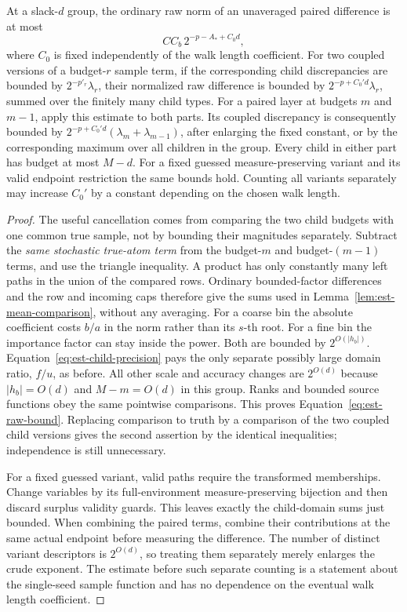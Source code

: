 \begin{lemma}\label{lem:est-raw-difference}
At a slack-$d$ group, the ordinary raw norm of an unaveraged paired
difference is at most
\begin{equation}
 C C_b\,2^{-p-A_*+C_0d},
 \label{eq:est-raw-bound}
\end{equation}
where $C_0$ is fixed independently of the walk length coefficient.
For two coupled versions of a budget-$r$ sample term, if the
corresponding child discrepancies are bounded by
$2^{-p'_r}\lambda_r$, their normalized raw difference is bounded by
$2^{-p+C_0'd}\lambda_r$, summed over the finitely many child types.
For a paired layer at budgets $m$ and $m-1$, apply this estimate to
both parts. Its coupled discrepancy is consequently bounded by
$2^{-p+C_0'd}(\lambda_m+\lambda_{m-1})$, after enlarging the fixed
constant, or by the corresponding maximum over all children in the
group. Every child in either part has budget at most $M-d$.
For a fixed guessed measure-preserving variant and its valid endpoint
restriction the same bounds hold.  Counting all variants separately may
increase $C_0'$ by a constant depending on the chosen walk length.
\end{lemma}
\begin{proof}
The useful cancellation comes from comparing the two child budgets with one common true sample, not by bounding their magnitudes separately. Subtract the \emph{same stochastic true-atom term} from the budget-$m$
and budget-$(m-1)$ terms, and use the triangle inequality.  A product has
only constantly many left paths in the union of the compared rows.
Ordinary bounded-factor differences and the row and incoming caps
therefore give the sums used in
Lemma~\ref{lem:est-mean-comparison}, without any averaging.  For a coarse
bin the absolute coefficient costs $b/a$ in the norm rather than its
$s$-th root.  For a fine bin the importance factor can stay inside the
power.  Both are bounded by $2^{O(|h_b|)}$.  Equation~\eqref{eq:est-child-precision}
pays the only separate possibly large domain ratio, $f/u$, as before.
All other scale and accuracy changes are $2^{O(d)}$ because
$|h_b|=O(d)$ and $M-m=O(d)$ in this group.  Ranks and bounded source
functions obey the same pointwise comparisons.  This proves
Equation~\eqref{eq:est-raw-bound}.  Replacing comparison to truth by a
comparison of the two coupled child versions gives the second assertion
by the identical inequalities; independence is still unnecessary.

For a fixed guessed variant, valid paths require the transformed
memberships.  Change variables by its full-environment measure-preserving
bijection and then discard surplus validity guards.  This leaves exactly
the child-domain sums just bounded.  When combining the paired terms,
combine their contributions at the same actual endpoint before measuring
the difference.  The number of distinct variant descriptors is
$2^{O(d)}$, so treating them separately merely enlarges the crude exponent.
The estimate before such separate counting is a statement about the
single-seed sample function and has no dependence on the eventual walk
length coefficient.
\end{proof}

